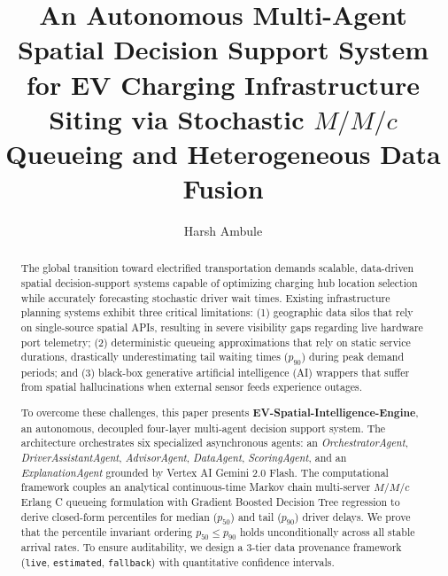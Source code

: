 \documentclass[preprint,12pt,authoryear]{elsarticle}
\begin{document}
\begin{frontmatter}

\title{An Autonomous Multi-Agent Spatial Decision Support System for EV Charging Infrastructure Siting via Stochastic $M/M/c$ Queueing and Heterogeneous Data Fusion}

\author[inst1]{Harsh Ambule}


\begin{abstract}
The global transition toward electrified transportation demands scalable, data-driven spatial decision-support systems capable of optimizing charging hub location selection while accurately forecasting stochastic driver wait times. Existing infrastructure planning systems exhibit three critical limitations: (1) geographic data silos that rely on single-source spatial APIs, resulting in severe visibility gaps regarding live hardware port telemetry; (2) deterministic queueing approximations that rely on static service durations, drastically underestimating tail waiting times ($p_{90}$) during peak demand periods; and (3) black-box generative artificial intelligence (AI) wrappers that suffer from spatial hallucinations when external sensor feeds experience outages. 

To overcome these challenges, this paper presents \textbf{EV-Spatial-Intelligence-Engine}, an autonomous, decoupled four-layer multi-agent decision support system. The architecture orchestrates six specialized asynchronous agents: an \textit{OrchestratorAgent}, \textit{DriverAssistantAgent}, \textit{AdvisorAgent}, \textit{DataAgent}, \textit{ScoringAgent}, and an \textit{ExplanationAgent} grounded by Vertex AI Gemini 2.0 Flash. The computational framework couples an analytical continuous-time Markov chain multi-server $M/M/c$ Erlang C queueing formulation with Gradient Boosted Decision Tree regression to derive closed-form percentiles for median ($p_{50}$) and tail ($p_{90}$) driver delays. We prove that the percentile invariant ordering $p_{50} \le p_{90}$ holds unconditionally across all stable arrival rates. To ensure auditability, we design a 3-tier data provenance framework (\texttt{live}, \texttt{estimated}, \texttt{fallback}) with quantitative confidence intervals.


\end{abstract}
\end{frontmatter}
\end{document}
